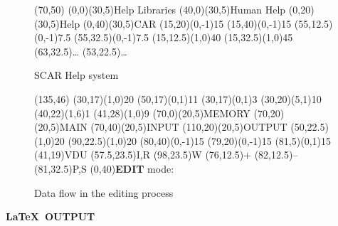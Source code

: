 \documentclass[twoside,11pt]{starlink}
\begin{document}
\begin{terminalv}
\begin{figure}
  \begin{center}
    \begin{picture}(70,50)
      \thicklines
      \put (0,0){\framebox(30,5){Help Libraries}}
      \put (40,0){\framebox(30,5){Human Help}}
      \put (0,20){\framebox(30,5){Help}}
      \put (0,40){\framebox(30,5){CAR}}
      \put (15,20){\vector(0,-1){15}}
      \put (15,40){\vector(0,-1){15}}
      \put (55,12.5){\vector(0,-1){7.5}}
      \put (55,32.5){\vector(0,-1){7.5}}
      \put (15,12.5){\line(1,0){40}}
      \put (15,32.5){\line(1,0){45}}
      \put (63,32.5){\ldots}
      \put (53,22.5){\ldots}
    \end{picture}
    \caption{SCAR Help system}
    \label{scar_help_system}
  \end{center}
\end{figure}

\begin{figure}
  \begin{center}
    \begin{picture}(135,46)
      \thicklines
      \put (30,17){\line (1,0){20}}
      \put (50,17){\line (0,1){11}}
      \put (30,17){\line (0,1){3}}
      \put (30,20){\line (5,1){10}}
      \put (40,22){\line (1,6){1}}
      \put (41,28){\line (1,0){9}}
      \put (70,0){\framebox(20,5){MEMORY}}
      \put (70,20){\framebox(20,5){MAIN}}
      \put (70,40){\framebox(20,5){INPUT}}
      \put (110,20){\framebox(20,5){OUTPUT}}
      \put (50,22.5){\vector (1,0){20}}
      \put (90,22.5){\vector (1,0){20}}
      \put (80,40){\vector (0,-1){15}}
      \put (79,20){\vector (0,-1){15}}
      \put (81,5){\vector (0,1){15}}
      \put (41,19){VDU}
      \put (57.5,23.5){I,R}
      \put (98,23.5){W}
      \put (76,12.5){+}
      \put (82,12.5){--}
      \put (81,32.5){P,S}
      \put (0,40){\textbf{EDIT} mode:}
    \end{picture}
    \caption{Data flow in the editing process}
    \label{data_flow_in_the_editing_process}
  \end{center}
\end{figure}
\end{terminalv}

\normalsize

\newpage

\begin{center}
  \textbf{\LaTeX\ OUTPUT}
\end{center}
\end{document}
